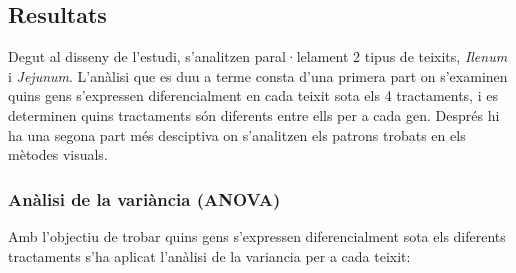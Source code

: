 \documentclass[english]{article}
\begin{document}
\subsection{Resultats}
Degut al disseny de l'estudi, s'analitzen paral·lelament 2 tipus de teixits, \textit{Ilenum} i \textit{Jejunum}. L'anàlisi que es duu a terme consta d'una primera part on s'examinen quins gens s'expressen diferencialment en cada teixit sota els 4 tractaments, i es determinen quins tractaments són diferents entre ells per a cada gen. Després hi ha una segona part més desciptiva on s'analitzen els patrons trobats en els mètodes visuals.
\subsubsection{Anàlisi de la variància (ANOVA)}
Amb l'objectiu de trobar quins gens s'expressen diferencialment sota els diferents tractaments s'ha aplicat l'anàlisi de la variancia per a cada teixit:
\end{document}
